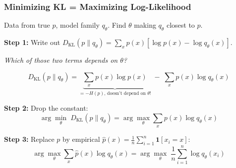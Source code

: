 \documentclass[aspectratio=169]{beamer}
\begin{document}
\begin{frame}
\frametitle{Minimizing KL = Maximizing Log-Likelihood}

\small
Data from true $p$, model family $q_\theta$. Find $\theta$ making $q_\theta$ closest to $p$.

\vspace{0.05cm}
\textbf{Step 1:} Write out $D_{\text{KL}}(p \| q_\theta) = \sum_x p(x) [\log p(x) - \log q_\theta(x)]$.

\textit{Which of those two terms depends on $\theta$?}

\pause
\vspace{-0.1cm}
$$D_{\text{KL}}(p \| q_\theta) = \underbrace{\sum_x p(x)\log p(x)}_{\text{$= -H(p)$, doesn't depend on $\theta$!}} \;-\; \sum_x p(x)\log q_\theta(x)$$

\vspace{-0.3cm}\pause
\textbf{Step 2:} Drop the constant:
\vspace{-0.2cm}
$$\arg\min_\theta \; D_{\text{KL}}(p \| q_\theta) = \arg\max_\theta \sum_x p(x)\log q_\theta(x)$$

\vspace{-0.3cm}\pause
\textbf{Step 3:} Replace $p$ by empirical $\hat{p}(x) = \frac{1}{n}\sum_{i=1}^n \mathbf{1}[x_i = x]$:
\vspace{-0.2cm}
$$\arg\max_\theta \sum_x \hat{p}(x)\log q_\theta(x) = \arg\max_\theta \;\frac{1}{n}\sum_{i=1}^n \log q_\theta(x_i)$$

\vspace{-0.15cm}
\begin{center}
\end{center}
\end{frame}
\end{document}
